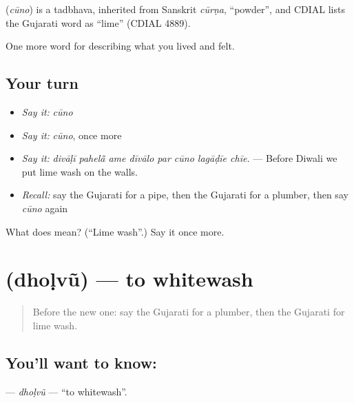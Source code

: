 \begin{cousinweb}
\textbf{} (\emph{cūno}) is a tadbhava, inherited from Sanskrit \emph{cūrṇa}, \textquotedblleft{}powder\textquotedblright{}, and CDIAL lists the Gujarati word as \textquotedblleft{}lime\textquotedblright{} (CDIAL 4889).
\end{cousinweb}

\begin{grammarlens}[title={What you've built}]
One more word for describing what you lived and felt.
\end{grammarlens}

\subsection*{Your turn}
\begin{itemize}
\raggedright
  \item \emph{Say it:} \emph{cūno}
  \item \emph{Say it:} \emph{cūno}, once more
  \item \emph{Say it:} \emph{divāḷī pahelā̃ ame dīvālo par cūno lagāḍīe chīe.} — Before Diwali we put lime wash on the walls.
  \item \emph{Recall:} say the Gujarati for a pipe, then the Gujarati for a plumber, then say \emph{cūno} again
\end{itemize}

\begin{tcolorbox}[breakable,colback=teal!4,colframe=teal!35!black,title={Before you move on}]
What does  mean? (\textquotedblleft{}Lime wash\textquotedblright{}.) Say it once more.
\end{tcolorbox}
\section[\texorpdfstring{\gu{ધોળવું} (dhoḷvũ)}{ધોળવું (dhoḷvũ)}]{ (dhoḷvũ) — to whitewash}

\label{lesson:GU-C516-dholvu-whitewash}



\begin{quote}
Before the new one: say the Gujarati for a plumber, then the Gujarati for lime wash.
\end{quote}

\subsection*{You'll want to know: }
\textbf{} — \emph{dhoḷvũ} — \textquotedblleft{}to whitewash\textquotedblright{}.

